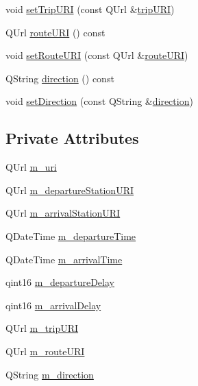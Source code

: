 \begin{DoxyCompactItemize}
\item 
void \mbox{\hyperlink{classFragments_1_1Fragment_a47c214a918ce0fe7469b309cbecf01a1}{set\+Trip\+U\+RI}} (const Q\+Url \&\mbox{\hyperlink{classFragments_1_1Fragment_aa3b1beb97e501bfa8ecb2127c2729803}{trip\+U\+RI}})
\item 
Q\+Url \mbox{\hyperlink{classFragments_1_1Fragment_a58ca3c71db8995b1a60b1eee17d65911}{route\+U\+RI}} () const
\item 
void \mbox{\hyperlink{classFragments_1_1Fragment_a26880f6f3800e4609685f1316b6db257}{set\+Route\+U\+RI}} (const Q\+Url \&\mbox{\hyperlink{classFragments_1_1Fragment_a58ca3c71db8995b1a60b1eee17d65911}{route\+U\+RI}})
\item 
Q\+String \mbox{\hyperlink{classFragments_1_1Fragment_a1c0ff28939d612a28589fdc1f47d0fd5}{direction}} () const
\item 
void \mbox{\hyperlink{classFragments_1_1Fragment_a0de734da455ac32aad779520d9cc7a10}{set\+Direction}} (const Q\+String \&\mbox{\hyperlink{classFragments_1_1Fragment_a1c0ff28939d612a28589fdc1f47d0fd5}{direction}})
\end{DoxyCompactItemize}
\subsection*{Private Attributes}
\begin{DoxyCompactItemize}
\item 
Q\+Url \mbox{\hyperlink{classFragments_1_1Fragment_a5e60c2e6902a55c1e2a3bb7a97d390f5}{m\+\_\+uri}}
\item 
Q\+Url \mbox{\hyperlink{classFragments_1_1Fragment_ad283a69630de2d45564976d8f4f20494}{m\+\_\+departure\+Station\+U\+RI}}
\item 
Q\+Url \mbox{\hyperlink{classFragments_1_1Fragment_ae7965d7528238e79ad22fd5f07666913}{m\+\_\+arrival\+Station\+U\+RI}}
\item 
Q\+Date\+Time \mbox{\hyperlink{classFragments_1_1Fragment_a0e8fdc91c05e8770524e5069e63a1c8d}{m\+\_\+departure\+Time}}
\item 
Q\+Date\+Time \mbox{\hyperlink{classFragments_1_1Fragment_ae9a5e9389dbe68090f9b14a73cf6ec32}{m\+\_\+arrival\+Time}}
\item 
qint16 \mbox{\hyperlink{classFragments_1_1Fragment_a4191e1af11c31f3b6e87ec860e2a51e1}{m\+\_\+departure\+Delay}}
\item 
qint16 \mbox{\hyperlink{classFragments_1_1Fragment_ab73eb5dd910919a3b74da379489ab51e}{m\+\_\+arrival\+Delay}}
\item 
Q\+Url \mbox{\hyperlink{classFragments_1_1Fragment_abd0750b77264363fe0069764fd7aeb3c}{m\+\_\+trip\+U\+RI}}
\item 
Q\+Url \mbox{\hyperlink{classFragments_1_1Fragment_a7540fc6c97499e59d7bc582bfc142dbb}{m\+\_\+route\+U\+RI}}
\item 
Q\+String \mbox{\hyperlink{classFragments_1_1Fragment_acc9b5abffc1a65636063e42943a9e529}{m\+\_\+direction}}
\end{DoxyCompactItemize}


